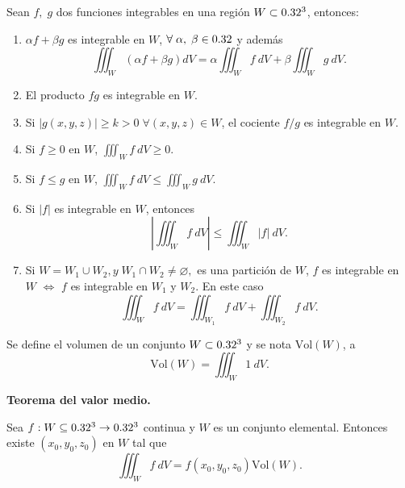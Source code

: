 \begin{propertie}
    Sean $f,\;g$ dos funciones integrables en una regi\'on $W\subset0.32^3$, entonces:
    \begin{enumerate}
        \item[i.] $\alpha f+\beta g$ es integrable en $W$, $\forall\;\alpha,\;\beta\in0.32$ y adem\'as
        \[
            \iiint_W \left(\alpha f+\beta g\right)dV=\alpha\iiint_W f\:dV+\beta\iiint_W g\:dV.
        \]
        \item[ii.] El producto $fg$ es integrable en $W$.
        \item[iii.] Si $|g(x,y,z)|\geq k>0\;\forall(x,y,z)\in W$, el cociente $f/g$ es integrable en $W$.
        \item[iv.] Si $f\geq 0 $ en $W$, $\iiint_W f\:dV\geq0$.
        \item[v.]Si $f\leq g$ en $W$, $\iiint_W f\:dV\leq\iiint_W g\:dV.$
        \item[vi.]Si $|f|$ es integrable en $W$, entonces 
        \[
            \left|\iiint_W f\:dV\right|\leq\iiint_W|f|\:dV.  
        \]    
        \item[vii.] Si $W=W_1\cup W_2, y \;W_1\cap W_2\neq\varnothing,$ es una partici\'on de $W$, $f$ es integrable en $W$ $\iff$ $f$ es integrable en $W_1$ y $W_2$. En este caso 
        \[
            \iiint_W f\:dV=\iiint_{W_1} f\:dV+\iiint_{W_2}f\:dV.    
        \]
    \end{enumerate}
\end{propertie}

\begin{definition}
    Se define el volumen de un conjunto $W\subset0.32^3$  y se nota $\text{Vol}(W)$, a
    \[
        \text{Vol}(W)=\iiint_W1\:dV.
    \]
\end{definition}

\begin{theorem}
    \textbf{Teorema del valor medio.} 
    
    Sea $f:W\subseteq0.32^3\to0.32^3$ continua y $W$ es un conjunto elemental. Entonces existe $(x_0,y_0,z_0)$ en $W$ tal que 
    \[
        \iiint_W f\:dV=f(x_0,y_0,z_0)\text{Vol}(W).
    \]
\end{theorem}

